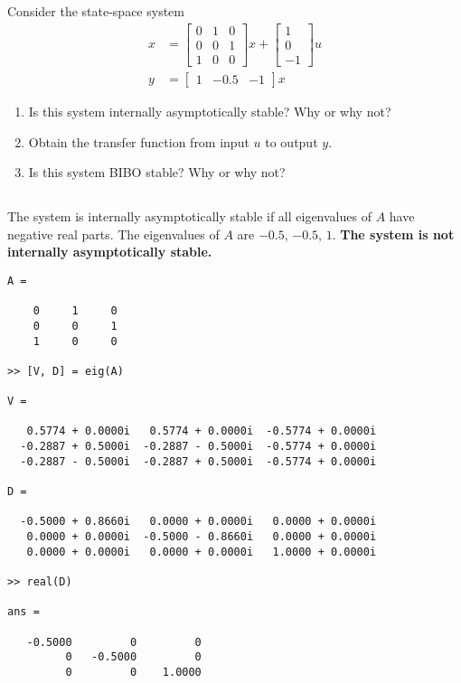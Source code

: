 \section{}
Consider the state-space system
\begin{align*}
    x &= 
    \begin{bmatrix}
        0 & 1 & 0 \\
        0 & 0 & 1 \\
        1 & 0 & 0
    \end{bmatrix} x +
    \begin{bmatrix}
        1 \\
        0 \\
        -1
    \end{bmatrix} u \\
    y &=
    \begin{bmatrix}
        1 & -0.5 & -1
    \end{bmatrix} x
\end{align*}
\begin{enumerate}[label=(\alph*)]
    \item Is this system internally asymptotically stable? Why or why not?
    \item Obtain the transfer function from input $u$ to output $y$.
    \item Is this system BIBO stable? Why or why not?
\end{enumerate}
\subsection{}
The system is internally asymptotically stable if all eigenvalues of $A$ have negative real parts. The eigenvalues of $A$ are $-0.5$, $-0.5$, $1$.
\textbf{The system is not internally asymptotically stable.} 
\begin{verbatim}
A =

    0     1     0
    0     0     1
    1     0     0

>> [V, D] = eig(A)

V =

   0.5774 + 0.0000i   0.5774 + 0.0000i  -0.5774 + 0.0000i
  -0.2887 + 0.5000i  -0.2887 - 0.5000i  -0.5774 + 0.0000i
  -0.2887 - 0.5000i  -0.2887 + 0.5000i  -0.5774 + 0.0000i

D =

  -0.5000 + 0.8660i   0.0000 + 0.0000i   0.0000 + 0.0000i
   0.0000 + 0.0000i  -0.5000 - 0.8660i   0.0000 + 0.0000i
   0.0000 + 0.0000i   0.0000 + 0.0000i   1.0000 + 0.0000i

>> real(D)

ans =

   -0.5000         0         0
         0   -0.5000         0
         0         0    1.0000
\end{verbatim}

